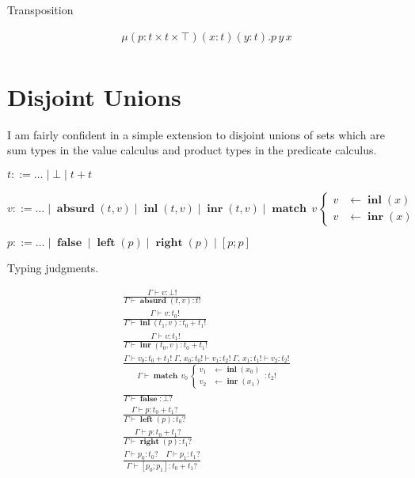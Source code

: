\documentclass[twocolumn, fleqn]{scrartcl}
\newcommand{\bnfdef}{\mathbin{::=}}
\DeclareMathOperator{\absurd}{\textbf{absurd}}
\DeclareMathOperator{\inl}{\textbf{inl}}
\DeclareMathOperator{\inr}{\textbf{inr}}
\DeclareMathOperator{\false}{\textbf{false}}
\DeclareMathOperator{\lft}{\textbf{left}}
\DeclareMathOperator{\rgt}{\textbf{right}}
\DeclareMathOperator{\case}{\textbf{match}}
\begin{document}
Transposition

\begin{multline*}
   \mu (p \colon t \times t \times \top) (x \colon t) (y \colon t). p \, y \, x\\
\end{multline*}

\section*{Disjoint Unions}

I am fairly confident in a simple extension to disjoint unions
of sets which are sum types in the value calculus and product types in
the predicate calculus.

\begin{description}[nosep]
\item[Types] \hfill \( t \bnfdef \ldots \mid \bot \mid t + t \)
\item[Values] \hfill \( v \bnfdef \ldots \mid \absurd(t, v) \mid \inl(t, v) \mid \inr(t, v) \mid
  \case \, v \,
  \begin{cases}
    v & \leftarrow \inl(x) \\
    v & \leftarrow \inr(x)
  \end{cases}
  \)
\item[Predicates] \hfill \( p \bnfdef \ldots \mid \false \mid \lft(p) \mid \rgt(p) \mid [ p ; p ] \)
\end{description}

Typing judgments.

\begin{multline*}
\frac{
  \Gamma \vdash v \colon \bot !
}{
  \Gamma \vdash \absurd(t, v) \colon t !
}\\
\frac{
  \Gamma \vdash v \colon t_0 !
}{
  \Gamma \vdash \inl(t_1, v) \colon t_0 + t_1 !
}\\
\frac{
  \Gamma \vdash v \colon t_1 !
}{
  \Gamma \vdash \inr(t_0, v) \colon t_0 + t_1 !
}\\
\frac{
  \Gamma \vdash v_0 \colon t_0 + t_1 ! \;
  \Gamma , \, x_0 \colon t_0 ! \vdash v_1 \colon t_2 ! \;
  \Gamma , \, x_1 \colon t_1 ! \vdash v_2 \colon t_2 !
}{
  \Gamma \vdash
  \case \, v_0 \,
  \begin{cases}
   v_1 & \leftarrow \inl(x_0) \\
   v_2 & \leftarrow \inr(x_1)
  \end{cases}
  \colon t_2 !
}\\
\frac{
}{
  \Gamma \vdash \false \colon \bot ?
}\\
\frac{
  \Gamma \vdash p \colon t_0 + t_1 ?
}{
  \Gamma \vdash \lft(p) \colon t_0 ?
}\\
\frac{
  \Gamma \vdash p \colon t_0 + t_1 ?
}{
  \Gamma \vdash \rgt(p) \colon t_1 ?
}\\
\frac{
  \Gamma \vdash p_0 \colon t_0 ? \quad
  \Gamma \vdash p_1 \colon t_1 ?
}{
  \Gamma \vdash [ p_0 ; p_1 ] \colon t_0 + t_1 ?
}\\
\end{multline*}
\end{document}
